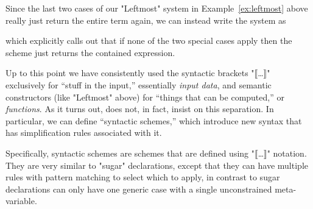 \documentclass[11pt]{article} %
\begin{document}
\begin{notation}
\begin{enumerate}

\end{enumerate}
\end{notation}

\begin{example}
  Since the last two cases of our "Leftmost" system in Example~\ref{ex:leftmost} above really just
  return the entire term again, we can instead write the system as
  which explicitly calls out that if none of the two special cases apply then the scheme just
  returns the contained expression.
\end{example}

Up to this point we have consistently used the syntactic brackets "⟦…⟧" exclusively for ``stuff in
the input,'' essentially \emph{input data}, and semantic constructors (like "Leftmost" above) for
``things that can be computed,'' or \emph{functions}. As it turns out, \HAX does not, in fact,
insist on this separation. In particular, we can define ``syntactic schemes,'' which introduce new
syntax that has simplification rules associated with it.

Specifically, syntactic schemes are schemes that are defined using "⟦…⟧" notation. They are very
similar to "sugar" declarations, except that they can have multiple rules with pattern matching to
select which to apply, in contrast to sugar declarations can only have one generic case with a
single unconstrained meta-variable.
\end{document}
